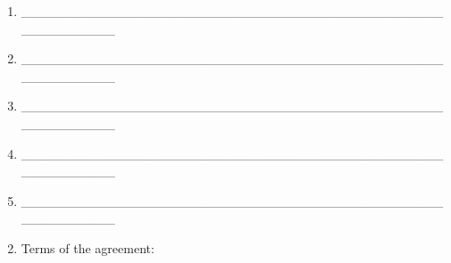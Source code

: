 \documentclass[letterpaper,10pt,english]{sphinxmanual}
\begin{document}
\begin{enumerate}
\item {} 
\_\_\_\_\_\_\_\_\_\_\_\_\_\_\_\_\_\_\_\_\_\_\_\_\_\_\_\_\_\_\_\_\_\_\_\_\_\_\_\_\_\_\_\_\_\_\_\_\_\_\_\_\_\_\_

\item {} 
\_\_\_\_\_\_\_\_\_\_\_\_\_\_\_\_\_\_\_\_\_\_\_\_\_\_\_\_\_\_\_\_\_\_\_\_\_\_\_\_\_\_\_\_\_\_\_\_\_\_\_\_\_\_\_

\item {} 
\_\_\_\_\_\_\_\_\_\_\_\_\_\_\_\_\_\_\_\_\_\_\_\_\_\_\_\_\_\_\_\_\_\_\_\_\_\_\_\_\_\_\_\_\_\_\_\_\_\_\_\_\_\_\_

\item {} 
\_\_\_\_\_\_\_\_\_\_\_\_\_\_\_\_\_\_\_\_\_\_\_\_\_\_\_\_\_\_\_\_\_\_\_\_\_\_\_\_\_\_\_\_\_\_\_\_\_\_\_\_\_\_\_

\item {} 
\_\_\_\_\_\_\_\_\_\_\_\_\_\_\_\_\_\_\_\_\_\_\_\_\_\_\_\_\_\_\_\_\_\_\_\_\_\_\_\_\_\_\_\_\_\_\_\_\_\_\_\_\_\_\_

\end{enumerate}
\begin{enumerate}
\setcounter{enumi}{1}
\item {} 
Terms of the agreement:

\end{enumerate}
\end{document}
